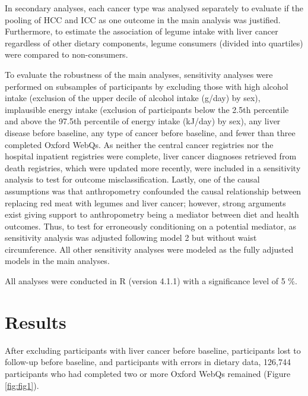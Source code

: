 \documentclass[nutrients,article,submit,moreauthors,pdftex]{Definitions/mdpi}
\begin{document}
In secondary analyses, each cancer type was analysed separately to
evaluate if the pooling of HCC and ICC as one outcome in the main
analysis was justified. Furthermore, to estimate the association of
legume intake with liver cancer regardless of other dietary components,
legume consumers (divided into quartiles) were compared to
non-consumers.

To evaluate the robustness of the main analyses, sensitivity analyses
were performed on subsamples of participants by excluding those with
high alcohol intake (exclusion of the upper decile of alcohol intake
(g/day) by sex), implausible energy intake (exclusion of participants
below the 2.5th percentile and above the 97.5th percentile of energy
intake (kJ/day) by sex), any liver disease before baseline, any type of
cancer before baseline, and fewer than three completed Oxford WebQs. As
neither the central cancer registries nor the hospital inpatient
registries were complete, liver cancer diagnoses retrieved from death
registries, which were updated more recently, were included in a
sensitivity analysis to test for outcome misclassification. Lastly, one
of the causal assumptions was that anthropometry confounded the causal
relationship between replacing red meat with legumes and liver cancer;
however, strong arguments exist giving support to anthropometry being a
mediator between diet and health outcomes. Thus, to test for erroneously
conditioning on a potential mediator, as sensitivity analysis was
adjusted following model 2 but without waist circumference. All other
sensitivity analyses were modeled as the fully adjusted models in the
main analyses.

All analyses were conducted in R (version 4.1.1) with a significance
level of 5 \%.

\hypertarget{sec3}{%
\section{Results}\label{sec3}}

After excluding participants with liver cancer before baseline,
participants lost to follow-up before baseline, and participants with
errors in dietary data, 126,744 participants who had completed two or
more Oxford WebQs remained (Figure \ref{fig:fig1}).
\end{document}
